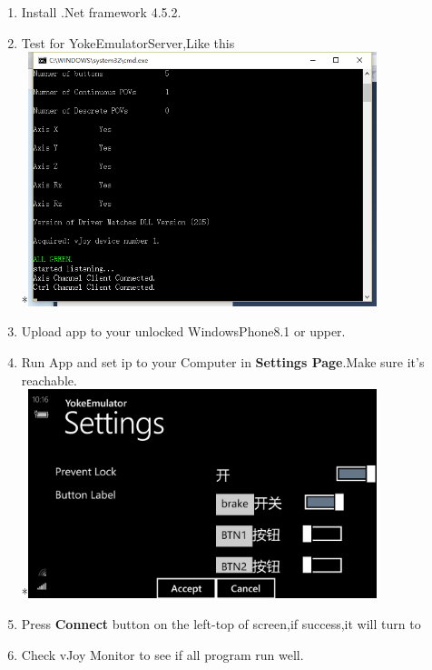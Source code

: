 \documentclass[12pt,a4paper]{article}
\begin{document}
\begin{CJK}{UTF8}{gbsn}
\begin{enumerate}
\item Install .Net framework 4.5.2.
\item Test for YokeEmulatorServer,Like this
\\*\includegraphics[width=4in]{install_finish_server.png}
\item Upload app to your unlocked WindowsPhone8.1 or upper.
\item Run App and set ip to your Computer in \textbf{Settings Page}.Make sure it's reachable.
\\*\includegraphics[width=4in]{install_app_settings.png}
\item Press \textbf{Connect} button on the left-top of screen,if success,it will turn to {\color{green}{DisConnect}}
\item Check vJoy Monitor to see if all program run well.

\end{enumerate}
\end{CJK}
\end{document}
